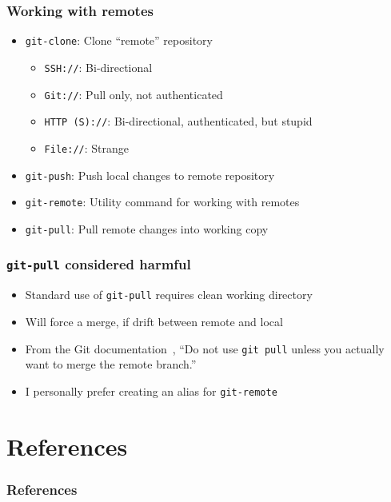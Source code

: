 \documentclass{beamer}
\begin{document}
\begin{frame}
\frametitle{Working with remotes}
\begin{itemize}
\item{\texttt{git-clone}: Clone ``remote'' repository}
\begin{itemize}
\item{\texttt{SSH://}: Bi-directional}
\item{\texttt{Git://}: Pull only, not authenticated}
\item{\texttt{HTTP (S)://}: Bi-directional, authenticated, but stupid}
\item{\texttt{File://}: Strange}
\end{itemize}
\item{\texttt{git-push}: Push local changes to remote repository}
\item{\texttt{git-remote}: Utility command for working with remotes}
\item{\texttt{git-pull}: Pull remote changes into working copy}
\end{itemize}
\end{frame}

\begin{frame}[fragile]
\frametitle{\texttt{git-pull} considered harmful}
\begin{itemize}
\item{Standard use of \texttt{git-pull} requires clean working directory}
\item{Will force a merge, if drift between remote and local}
\item{From the Git documentation~\cite{website:gitworkflows7}, ``Do not use
\texttt{git pull} unless you actually want to merge the remote branch.''}
\item{I personally prefer creating an alias for \texttt{git-remote}}
\end{itemize}

\end{frame}

\section*{References}
\begin{frame}[allowframebreaks]
\frametitle{References}
\nocite{*}
\renewcommand{\refname}{}


\end{frame}

\end{document}
